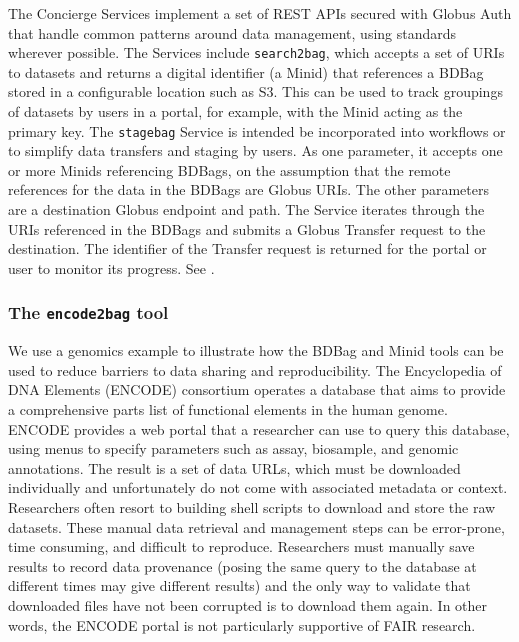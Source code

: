 \documentclass[11pt]{article}
\begin{document}
The Concierge Services implement a set of REST APIs secured with Globus Auth that handle common patterns around data management, using standards wherever possible. 
The Services include \texttt{search2bag}, which accepts a set of URIs to datasets and returns a digital identifier (a Minid) that references a BDBag stored in a configurable location such as S3. 
This can be used to track groupings of datasets by users in a portal, for example, with the Minid acting as the primary key. 
The \texttt{stagebag} Service is intended be incorporated into workflows or to simplify data transfers and staging by users. 
As one parameter, it accepts one or more Minids referencing BDBags, on the assumption that the remote references for the data in the BDBags are Globus URIs. 
The other parameters are a destination Globus endpoint and path. 
The Service iterates through the URIs referenced in the BDBags and submits a Globus Transfer request to the destination. 
The identifier of the Transfer request is returned for the portal or user to monitor its progress. 
See .

\subsubsection{The \texttt{encode2bag} tool}

We use a genomics example to illustrate how the BDBag and Minid tools can be used to reduce
barriers to data sharing and reproducibility.
The Encyclopedia of DNA Elements (ENCODE) consortium operates a database that aims to provide a
comprehensive parts list of functional elements in the human genome.
ENCODE provides a web portal that a researcher can use to query this database,
using menus to specify parameters such as assay, biosample, and genomic annotations.
The result is a set of data URLs,
which must be downloaded individually and unfortunately do not come with associated metadata or context.
Researchers often resort to building shell scripts to download and store the raw datasets.
These manual data retrieval and management steps can be error-prone,
time consuming, and difficult to reproduce.
Researchers must manually save results to record data provenance (posing the same query to the database at different
times may give different results)
and the only way to validate that downloaded files have not been corrupted is to download them again.
In other words, the ENCODE portal is not particularly supportive of FAIR research.
\end{document}
